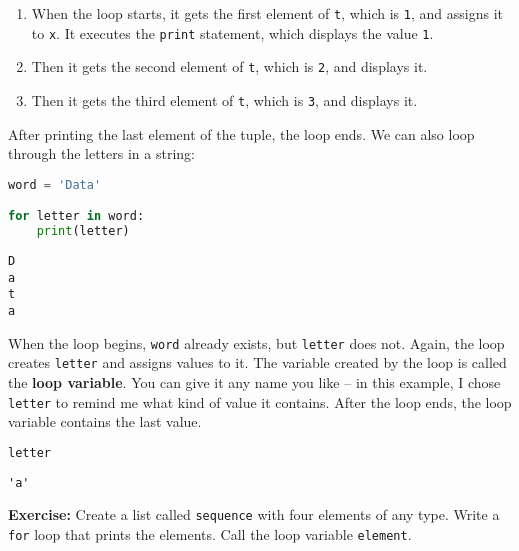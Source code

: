 \begin{enumerate}
\def\labelenumi{\arabic{enumi}.}
\item
  When the loop starts, it gets the first element of
  \passthrough{\lstinline!t!}, which is \passthrough{\lstinline!1!}, and
  assigns it to \passthrough{\lstinline!x!}. It executes the
  \passthrough{\lstinline!print!} statement, which displays the value
  \passthrough{\lstinline!1!}.
\item
  Then it gets the second element of \passthrough{\lstinline!t!}, which
  is \passthrough{\lstinline!2!}, and displays it.
\item
  Then it gets the third element of \passthrough{\lstinline!t!}, which
  is \passthrough{\lstinline!3!}, and displays it.
\end{enumerate}

After printing the last element of the tuple, the loop ends. We can also
loop through the letters in a string:

\begin{lstlisting}[language=Python,style=source]
word = 'Data'

for letter in word:
    print(letter)
\end{lstlisting}

\begin{lstlisting}[style=output]
D
a
t
a
\end{lstlisting}

When the loop begins, \passthrough{\lstinline!word!} already exists, but
\passthrough{\lstinline!letter!} does not. Again, the loop creates
\passthrough{\lstinline!letter!} and assigns values to it. The variable
created by the loop is called the \textbf{loop variable}. You can give
it any name you like -- in this example, I chose
\passthrough{\lstinline!letter!} to remind me what kind of value it
contains. After the loop ends, the loop variable contains the last
value.

\begin{lstlisting}[language=Python,style=source]
letter
\end{lstlisting}

\begin{lstlisting}[style=output]
'a'
\end{lstlisting}

\textbf{Exercise:} Create a list called
\passthrough{\lstinline!sequence!} with four elements of any type. Write
a \passthrough{\lstinline!for!} loop that prints the elements. Call the
loop variable \passthrough{\lstinline!element!}.

